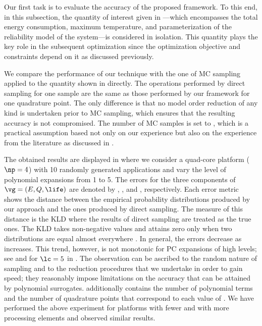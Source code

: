 Our first task is to evaluate the accuracy of the proposed framework. To this
end, in this subsection, the quantity of interest given in
---which encompasses the total energy
consumption, maximum temperature, and parameterization of the reliability model
of the system---is considered in isolation. This quantity plays the key role in
the subsequent optimization since the optimization objective and constraints
depend on it as discussed previously.

We compare the performance of our technique with the one of \ac{MC} sampling
applied to the quantity shown in  directly.
The operations performed by direct sampling for one sample are the same as those
performed by our framework for one quadrature point. The only difference is that
no model order reduction of any kind is undertaken prior to \ac{MC} sampling,
which ensures that the resulting accuracy is not compromised. The number of
\ac{MC} samples is set to , which is a practical assumption based
not only on our experience but also on the experience from the literature as
discussed in .

The obtained results are displayed in  where
we consider a quad-core platform ($\np = 4$) with 10 randomly generated
applications and vary the level of polynomial expansions \lc from 1 to 5. The
errors for the three components of $\vg = (E, Q, \life)$ are denoted by
, , and \error{\life}, respectively. Each error metric shows
the distance between the empirical probability distributions produced by our
approach and the ones produced by direct sampling. The measure of this distance
is the \ac{KLD} \cite{gelman2013, hastie2013} where the results of direct
sampling are treated as the true ones. The \ac{KLD} takes non-negative values
and attains zero only when two distributions are equal almost everywhere
\cite{durrett2010}. In general, the errors decrease as \lc increases. This
trend, however, is not monotonic for \ac{PC} expansions of high levels; see
 and \error{\life} for $\lc = 5$ in .
The observation can be ascribed to the random nature of sampling and to the
reduction procedures that we undertake in order to gain speed; they reasonably
impose limitations on the accuracy that can be attained by polynomial
surrogates.  additionally contains the number
of polynomial terms \nc and the number of quadrature points \nq that correspond
to each value of \lc. We have performed the above experiment for platforms with
fewer and with more processing elements and observed similar results.

